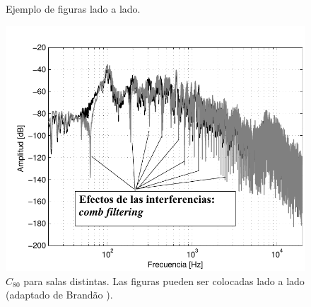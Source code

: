 \documentclass[12pt, a4paper, twoside, twocolumn]{article}
\begin{document}
\begin{figure}[H]
  \centering
	\qquad
  \caption{Ejemplo de figuras lado a lado.}
  \label{subfig.exemplo}
\end{figure}

\begin{figure}[ht!]
	\centering \vspace{-3mm}
        \includegraphics[width=0.98\linewidth,page=1]{figs/Combfilter-Brandao-2017-sp.pdf}
        \vspace{-0.4em}
        \caption{$C_{80}$ para salas distintas. Las figuras pueden ser colocadas lado a lado (adaptado de Brandão \cite{Brandao-2017}).}
	\label{fig:C80}%
\end{figure}
\end{document}
